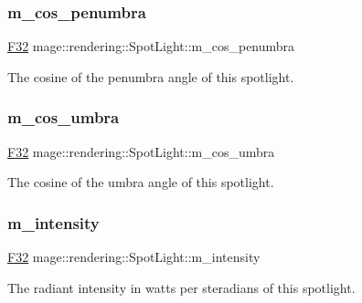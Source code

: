 \subsubsection{\texorpdfstring{m\+\_\+cos\+\_\+penumbra}{m\_cos\_penumbra}}
{\footnotesize\ttfamily \hyperlink{namespacemage_aa97e833b45f06d60a0a9c4fc22ae02c0}{F32} mage\+::rendering\+::\+Spot\+Light\+::m\+\_\+cos\+\_\+penumbra\hspace{0.3cm}{\ttfamily [private]}}

The cosine of the penumbra angle of this spotlight. \hypertarget{classmage_1_1rendering_1_1_spot_light_a2152cbea4f216f8ae18550a8c9e5b5e0}{}\label{classmage_1_1rendering_1_1_spot_light_a2152cbea4f216f8ae18550a8c9e5b5e0} 
\subsubsection{\texorpdfstring{m\+\_\+cos\+\_\+umbra}{m\_cos\_umbra}}
{\footnotesize\ttfamily \hyperlink{namespacemage_aa97e833b45f06d60a0a9c4fc22ae02c0}{F32} mage\+::rendering\+::\+Spot\+Light\+::m\+\_\+cos\+\_\+umbra\hspace{0.3cm}{\ttfamily [private]}}

The cosine of the umbra angle of this spotlight. \hypertarget{classmage_1_1rendering_1_1_spot_light_af91b9fc5303e5c2c5e90337f42db015c}{}\label{classmage_1_1rendering_1_1_spot_light_af91b9fc5303e5c2c5e90337f42db015c} 
\subsubsection{\texorpdfstring{m\+\_\+intensity}{m\_intensity}}
{\footnotesize\ttfamily \hyperlink{namespacemage_aa97e833b45f06d60a0a9c4fc22ae02c0}{F32} mage\+::rendering\+::\+Spot\+Light\+::m\+\_\+intensity\hspace{0.3cm}{\ttfamily [private]}}

The radiant intensity in watts per steradians of this spotlight. \hypertarget{classmage_1_1rendering_1_1_spot_light_a83027e02fbeee3ee5698ebb498ff30be}{}\label{classmage_1_1rendering_1_1_spot_light_a83027e02fbeee3ee5698ebb498ff30be} 
